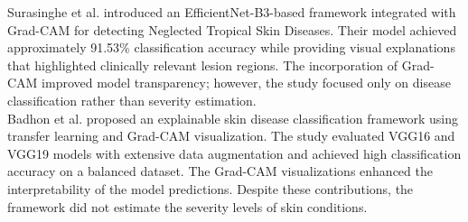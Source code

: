 Surasinghe et al.\cite{Surasinghe2023} introduced an EfficientNet-B3-based framework integrated with Grad-CAM for detecting Neglected Tropical Skin Diseases. Their model achieved approximately 91.53\% classification accuracy while providing visual explanations that highlighted clinically relevant lesion regions. The incorporation of Grad-CAM improved model transparency; however, the study focused only on disease classification rather than severity estimation.\\
Badhon et al.\cite{Badhon2024} proposed an explainable skin disease classification framework using transfer learning and Grad-CAM visualization. The study evaluated VGG16 and VGG19 models with extensive data augmentation and achieved high classification accuracy on a balanced dataset. The Grad-CAM visualizations enhanced the interpretability of the model predictions. Despite these contributions, the framework did not estimate the severity levels of skin conditions.
\begin{table}[htbp]
\centering
{}
\caption{Comparative Analysis of Related Studies and the Proposed Framework}
\label{tab:comparative_analysis}
\end{table}

